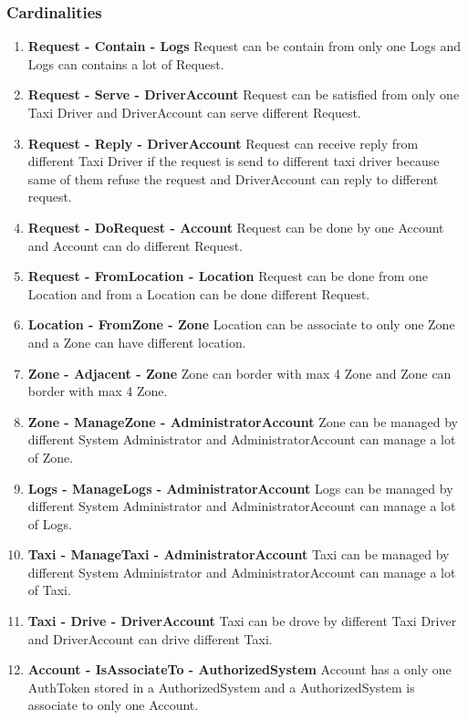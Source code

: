 \documentclass[11pt, a4paper,titlepage]{article}
\begin{document}
\subsubsection{Cardinalities}
\begin{enumerate}
	\item \textbf{Request - Contain - Logs}
	Request can be contain from only one Logs and Logs can contains a lot of Request.
	\item \textbf{Request - Serve - DriverAccount} 	
	Request can be satisfied from only one Taxi Driver and DriverAccount can serve different Request.
	\item \textbf{Request - Reply - DriverAccount} 	
	Request can receive reply from different Taxi Driver if the request is send
	to different taxi driver because same of them refuse the request and 
	DriverAccount can reply to different request.
	\item \textbf{Request - DoRequest - Account} 	
	Request can be done by one Account and Account can do different Request.
	\item \textbf{Request - FromLocation - Location} 	
	Request can be done from one Location and from a Location can be done different Request.
	\item \textbf{Location - FromZone - Zone} 	
	Location can be associate to only one Zone and a Zone can have different location.
	\item \textbf{Zone - Adjacent - Zone} 	
	Zone can border with max 4 Zone and Zone can border with max 4 Zone.
	\item \textbf{Zone - ManageZone - AdministratorAccount}
	Zone can be managed by different System Administrator and AdministratorAccount can manage a lot of Zone.
	\item \textbf{Logs - ManageLogs - AdministratorAccount} 	
	Logs can be managed by different System Administrator and AdministratorAccount can manage a lot of Logs.
	\item \textbf{Taxi - ManageTaxi - AdministratorAccount} 	
	Taxi can be managed by different System Administrator and AdministratorAccount can manage a lot of Taxi.
	\item \textbf{Taxi - Drive - DriverAccount} 	
	Taxi can be drove by different Taxi Driver and DriverAccount can drive different Taxi.
	\item \textbf{Account - IsAssociateTo - AuthorizedSystem} 	
	Account has a only one AuthToken stored in a AuthorizedSystem and a AuthorizedSystem is associate to only one Account.
\end{enumerate}
\end{document}
